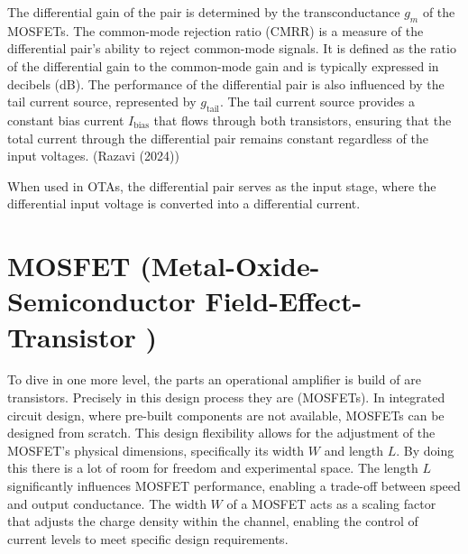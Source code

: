 \documentclass[
  letterpaper,
]{scrbook}
\begin{document}
The differential gain of the pair is determined by the transconductance
\(g_m\) of the MOSFETs. The common-mode rejection ratio (CMRR) is a
measure of the differential pair's ability to reject common-mode
signals. It is defined as the ratio of the differential gain to the
common-mode gain and is typically expressed in decibels (dB). The
performance of the differential pair is also influenced by the tail
current source, represented by \(g_{\text{tail}}\). The tail current
source provides a constant bias current \(I_{\text{bias}}\) that flows
through both transistors, ensuring that the total current through the
differential pair remains constant regardless of the input voltages.
(Razavi (2024))

\begin{tcolorbox}[enhanced jigsaw, title=\textcolor{quarto-callout-important-color}{\faExclamation}\hspace{0.5em}{Role in an OTA}, colback=white, bottomrule=.15mm, coltitle=black, colbacktitle=quarto-callout-important-color!10!white, toptitle=1mm, colframe=quarto-callout-important-color-frame, rightrule=.15mm, arc=.35mm, leftrule=.75mm, bottomtitle=1mm, titlerule=0mm, toprule=.15mm, opacitybacktitle=0.6, opacityback=0, left=2mm, breakable]

When used in OTAs, the differential pair serves as the input stage,
where the differential input voltage is converted into a differential
current.

\end{tcolorbox}

\section{MOSFET (Metal-Oxide-Semiconductor Field-Effect-Transistor
)}\label{mosfet-metal-oxide-semiconductor-field-effect-transistor}

To dive in one more level, the parts an operational amplifier is build
of are transistors. Precisely in this design process they are (MOSFETs).
In integrated circuit design, where pre-built components are not
available, MOSFETs can be designed from scratch. This design flexibility
allows for the adjustment of the MOSFET's physical dimensions,
specifically its width \(W\) and length \(L\). By doing this there is a
lot of room for freedom and experimental space. The length \(L\)
significantly influences MOSFET performance, enabling a trade-off
between speed and output conductance. The width \(W\) of a MOSFET acts
as a scaling factor that adjusts the charge density within the channel,
enabling the control of current levels to meet specific design
requirements.
\end{document}
